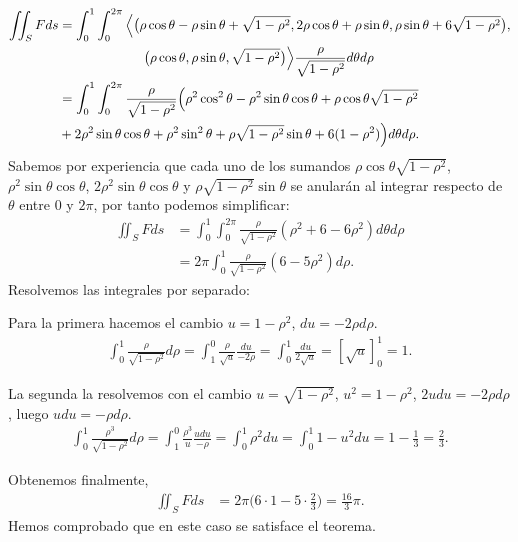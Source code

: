 \documentclass[12pt,spanish]{article}
\theoremstyle{definition}
\theoremstyle{remark}
\begin{document}
\begin{align*}
\iint_{S} F ds&=\int_0^1\int_0^{2\pi}\Big\langle \big(\rho\cos \theta-\rho\sin\theta+\sqrt{1-\rho^2},2\rho\cos \theta+\rho\sin\theta,\rho\sin\theta+6\sqrt{1-\rho^2}\big), \\ &~\hspace{21.5mm}\big(\rho\cos \theta, \rho\sin\theta, \sqrt{1-\rho^2}\big)\Big\rangle \frac{\rho}{\sqrt{1-\rho^2}} d\theta d\rho \\ 
&=\int_0^1\int_0^{2\pi}\frac{\rho}{\sqrt{1-\rho^2}}\Big(\rho^2\cos^2\theta-\rho^2\sin\theta\cos\theta +\rho\cos\theta\sqrt{1-\rho^2}  \\
&+2\rho^2\sin\theta\cos\theta+\rho^2\sin^2\theta+\rho\sqrt{1-\rho^2}\sin\theta+6(1-\rho^2)\Big)d\theta d\rho.
\end{align*}
Sabemos por experiencia que cada uno de los sumandos $\rho\cos\theta\sqrt{1-\rho^2}$, $\rho^2\sin\theta\cos\theta$, $2\rho^2\sin\theta\cos\theta$ y $\rho\sqrt{1-\rho^2}\sin\theta$ se anularán al integrar respecto de $\theta$ entre $0$ y $2\pi$, por tanto podemos simplificar:
\begin{align*}
\iint_{S} F ds&=\int_0^1\int_0^{2\pi}\frac{\rho}{\sqrt{1-\rho^2}}(\rho^2+6-6\rho^2)d\theta d\rho\\
&=2\pi\int_0^1\frac{\rho}{\sqrt{1-\rho^2}}(6-5\rho^2) d\rho.
\end{align*}
Resolvemos las integrales por separado:

Para la primera hacemos el cambio $u=1-\rho^2$, $du=-2\rho d\rho$.
\begin{align*}
\int_0^1\frac{\rho}{\sqrt{1-\rho^2}}d\rho=\int_1^0 \frac{\rho}{\sqrt{u}}\frac{du}{-2\rho}=\int_0^1\frac{du}{2\sqrt{u}}=\left[\sqrt{u}\right]_0^1=1.
\end{align*}

La segunda la resolvemos con el cambio $u=\sqrt{1-\rho^2}$, $u^2=1-\rho^2$, $2udu=-2\rho d\rho$, luego $udu=-\rho d\rho$.
\begin{align*}
\int_0^1\frac{\rho^3}{\sqrt{1-\rho^2}}d\rho=\int_1^0 \frac{\rho^3}{u}\frac{udu}{-\rho}=\int_0^1\rho^2 du=\int_0^1 1-u^2 du=1-\frac{1}{3}=\frac{2}{3}.
\end{align*}

Obtenemos finalmente, 
\begin{align*}
\iint_{S} F ds&=2\pi\Big(6\cdot 1-5\cdot \frac{2}{3}\Big)=\frac{16}{3}\pi.
\end{align*}
Hemos comprobado que en este caso se satisface el teorema.
\end{document}
